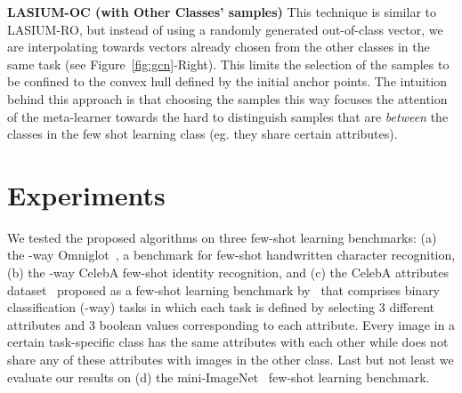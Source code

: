 \documentclass{article}
\begin{document}
{\bf{LASIUM-OC} (with Other Classes' samples)} This technique is similar to LASIUM-RO, but instead of using a randomly generated out-of-class vector, we are interpolating towards vectors already chosen from the other classes in the same task (see Figure~\ref{fig:gcn}-Right). This limits the selection of the samples to be confined to the convex hull defined by the initial anchor points. The intuition behind this approach is that choosing the samples this way focuses the attention of the meta-learner towards the hard to distinguish samples that are {\em between} the classes in the few shot learning class (eg. they share certain attributes). 













 

\section{Experiments}



We tested the proposed algorithms on three few-shot learning benchmarks: (a) the -way Omniglot~\cite{lake2011one}, a benchmark for few-shot handwritten character recognition, (b) the -way CelebA few-shot identity recognition, and (c) the CelebA attributes dataset~\cite{liu2015faceattributes} proposed as a few-shot learning benchmark by~\cite{finn2017model} that comprises binary classification (-way) tasks in which each task is defined by selecting 3 different attributes and 3 boolean values corresponding to each attribute. Every image in a certain task-specific class has the same attributes with each other while does not share any of these attributes with images in the other class. Last but not least we evaluate our results on (d) the mini-ImageNet~\cite{ravi2016optimization} few-shot learning benchmark.
\end{document}
